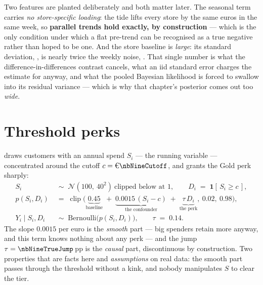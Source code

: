 Two features are planted deliberately and both matter later. The seasonal term carries \emph{no
store-specific loading}: the tide lifts every store by the same euros in the same week, so
\textbf{parallel trends hold exactly, by construction} --- which is the only condition under which
a flat pre-trend can be recognised as a true negative rather than hoped to be one. And the store
baseline is \emph{large}: its standard deviation, \eur{\nbEightAlphaSd}, is nearly twice the weekly
noise, \eur{\nbEightNoiseSd}. That single number is what the difference-in-differences contrast
cancels, what an iid standard error charges the estimate for anyway, and what the pooled Bayesian
likelihood is forced to swallow into its residual variance --- which is why that chapter's
posterior comes out too \emph{wide}.

\section{Threshold perks}
\label{app:dgp:rdd}

 draws \nbNineN{} customers with an annual spend $S_i$ --- the running variable
--- concentrated around the cutoff $c = \eur{\nbNineCutoff}$, and grants the Gold perk sharply:
%
\begin{align}
  S_i &\;\sim\; \mathcal N\!\left(100,\ 40^{2}\right)\ \text{clipped below at } 1,
        \qquad D_i \;=\; \mathbf 1\!\left[\,S_i \ge c\,\right], \label{eq:app:rd_s}\\
  p(S_i, D_i) &\;=\; \operatorname{clip}\!\Big(
      \underbrace{0.45}_{\text{baseline}}
      \;+\; \underbrace{0.0015\,(S_i - c)}_{\text{the confounder}}
      \;+\; \underbrace{\tau\, D_i}_{\text{the perk}},\ 0.02,\ 0.98\Big), \label{eq:app:rd_p}\\
  Y_i \mid S_i, D_i &\;\sim\; \text{Bernoulli}\big(p(S_i, D_i)\big),
      \qquad \tau \;=\; 0.14 . \label{eq:app:rd_y}
\end{align}
%
The slope $0.0015$ per euro is the \emph{smooth} part --- big spenders retain more anyway, and this
term knows nothing about any perk --- and the jump $\tau = \nbNineTrueJump$\,pp is the
\emph{causal} part, discontinuous by construction. Two properties that are facts here and
\emph{assumptions} on real data: the smooth part passes through the threshold without a kink, and
nobody manipulates $S$ to clear the tier.


